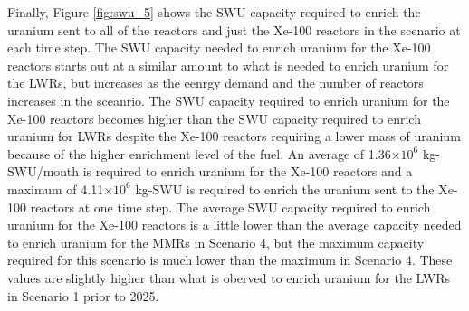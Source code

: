Finally, Figure \ref{fig:swu_5} shows the \gls{SWU} capacity required
to enrich the uranium sent to all of the reactors and just the Xe-100
reactors in the scenario at each time step. The \gls{SWU} capacity needed 
to enrich uranium for the Xe-100 reactors starts out at a similar 
amount to what is needed to enrich uranium for the \glspl{LWR}, but 
increases as the eenrgy demand and the number of reactors increases 
in the sceanrio. The \gls{SWU} capacity required to enrich uranium 
for the Xe-100 reactors becomes higher than the \gls{SWU} capacity 
required to enrich uranium for \glspl{LWR} despite the Xe-100 
reactors requiring a lower mass of uranium because of the higher 
enrichment level of the fuel. An average of 1.36$\times 10^6$ 
kg-\gls{SWU}/month is required 
to enrich uranium for the Xe-100 reactors and a maximum of 
4.11$\times 10^6$ kg-\gls{SWU} is required to enrich the uranium sent to the 
Xe-100 reactors at one time step. The average \gls{SWU} capacity 
required to enrich uranium for the Xe-100 reactors is a little lower 
than the average capacity needed to enrich uranium for the \glspl{MMR}
in Scenario 4, but the maximum capacity required for this scenario is much 
lower than the maximum in Scenario 4. These values are slightly higher 
than what is oberved to enrich uranium for the \glspl{LWR} in Scenario 1
prior to 2025.

